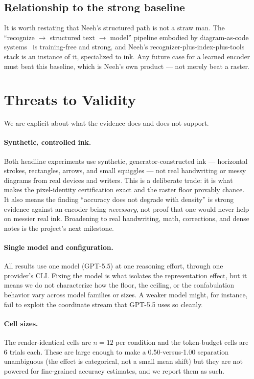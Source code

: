 \documentclass[11pt]{article}
\begin{document}
\subsection{Relationship to the strong baseline}
It is worth restating that Neeh's structured path is not a straw man. The
``recognize $\rightarrow$ structured text $\rightarrow$ model'' pipeline embodied
by diagram-as-code systems~\cite{diagramcode} is training-free and strong, and
Neeh's recognizer-plus-index-plus-tools stack is an instance of it, specialized
to ink. Any future case for a learned encoder must beat this baseline, which is
Neeh's own product --- not merely beat a raster.

\section{Threats to Validity}
\label{sec:threats}

We are explicit about what the evidence does and does not support.

\paragraph{Synthetic, controlled ink.} Both headline experiments use synthetic,
generator-constructed ink --- horizontal strokes, rectangles, arrows, and small
squiggles --- not real handwriting or messy diagrams from real devices and
writers. This is a deliberate trade: it is what makes the pixel-identity
certification exact and the raster floor provably chance. It also means the
finding ``accuracy does not degrade with density'' is strong evidence against an
encoder being \emph{necessary}, not proof that one would never help on messier
real ink. Broadening to real handwriting, math, corrections, and dense notes is
the project's next milestone.

\paragraph{Single model and configuration.} All results use one model (GPT-5.5)
at one reasoning effort, through one provider's CLI. Fixing the model is what
isolates the representation effect, but it means we do not characterize how the
floor, the ceiling, or the confabulation behavior vary across model families or
sizes. A weaker model might, for instance, fail to exploit the coordinate stream
that GPT-5.5 uses so cleanly.

\paragraph{Cell sizes.} The render-identical cells are $n=12$ per condition and
the token-budget cells are 6 trials each. These are large enough to make a
0.50-versus-1.00 separation unambiguous (the effect is categorical, not a small
mean shift) but they are not powered for fine-grained accuracy estimates, and we
report them as such.
\end{document}
